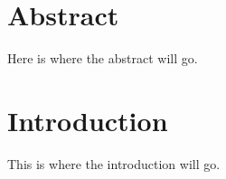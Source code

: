 \section*{Abstract}
Here is where the abstract will go. 



\section{Introduction} 
This is where the introduction will go.